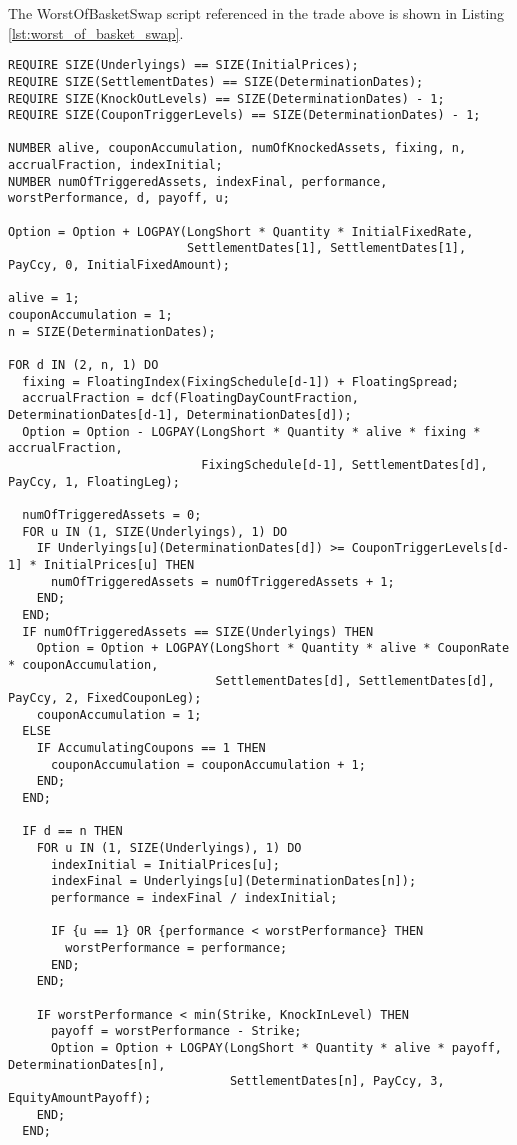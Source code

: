 The WorstOfBasketSwap script referenced in the trade above is shown in Listing \ref{lst:worst_of_basket_swap}.

\begin{listing}[hbt] 
\begin{verbatim} 
REQUIRE SIZE(Underlyings) == SIZE(InitialPrices);
REQUIRE SIZE(SettlementDates) == SIZE(DeterminationDates);
REQUIRE SIZE(KnockOutLevels) == SIZE(DeterminationDates) - 1;
REQUIRE SIZE(CouponTriggerLevels) == SIZE(DeterminationDates) - 1;

NUMBER alive, couponAccumulation, numOfKnockedAssets, fixing, n, accrualFraction, indexInitial;
NUMBER numOfTriggeredAssets, indexFinal, performance, worstPerformance, d, payoff, u;

Option = Option + LOGPAY(LongShort * Quantity * InitialFixedRate,
                         SettlementDates[1], SettlementDates[1], PayCcy, 0, InitialFixedAmount);

alive = 1;
couponAccumulation = 1;
n = SIZE(DeterminationDates);

FOR d IN (2, n, 1) DO
  fixing = FloatingIndex(FixingSchedule[d-1]) + FloatingSpread;
  accrualFraction = dcf(FloatingDayCountFraction, DeterminationDates[d-1], DeterminationDates[d]);
  Option = Option - LOGPAY(LongShort * Quantity * alive * fixing * accrualFraction,
                           FixingSchedule[d-1], SettlementDates[d], PayCcy, 1, FloatingLeg);
  
  numOfTriggeredAssets = 0;
  FOR u IN (1, SIZE(Underlyings), 1) DO
    IF Underlyings[u](DeterminationDates[d]) >= CouponTriggerLevels[d-1] * InitialPrices[u] THEN
      numOfTriggeredAssets = numOfTriggeredAssets + 1;
    END;
  END;
  IF numOfTriggeredAssets == SIZE(Underlyings) THEN
    Option = Option + LOGPAY(LongShort * Quantity * alive * CouponRate * couponAccumulation,
                             SettlementDates[d], SettlementDates[d], PayCcy, 2, FixedCouponLeg);
    couponAccumulation = 1;
  ELSE
    IF AccumulatingCoupons == 1 THEN
      couponAccumulation = couponAccumulation + 1;
    END;
  END;

  IF d == n THEN
    FOR u IN (1, SIZE(Underlyings), 1) DO
      indexInitial = InitialPrices[u];
      indexFinal = Underlyings[u](DeterminationDates[n]);
      performance = indexFinal / indexInitial;

      IF {u == 1} OR {performance < worstPerformance} THEN
        worstPerformance = performance;
      END;
    END;       

    IF worstPerformance < min(Strike, KnockInLevel) THEN
      payoff = worstPerformance - Strike;
      Option = Option + LOGPAY(LongShort * Quantity * alive * payoff, DeterminationDates[n],
                               SettlementDates[n], PayCcy, 3, EquityAmountPayoff);
    END;
  END;


\end{verbatim}
\end{listing}
